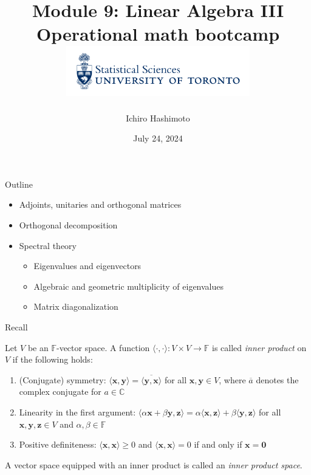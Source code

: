 \documentclass [aspectratio=169]{beamer}
\title[]{Module 9: Linear Algebra III \\ {\large Operational math bootcamp}\\ \includegraphics[width=8cm]{dept_logo.png}\vspace{-1em}}
\author[]{Ichiro Hashimoto}
\institute[]{University of Toronto}
\date{July 24, 2024}
\newcommand{\bx}{{\mathbf{x}}}
\newcommand{\by}{{\mathbf{y}}}
\newcommand{\bz}{{\mathbf{z}}}
\newcommand{\zerovec}{{\mathbf{0}}}
\newcommand{\innerprod}[1]{\langle #1 \rangle}
\newcommand{\C}{{\mathbb{C}}}
\newcommand{\F}{{\mathbb{F}}}
\begin{document}
{
\begin{frame}
    \titlepage
\end{frame}
}

\begin{frame}{Outline}

\begin{itemize}
\setlength\itemsep{1em}
\item Adjoints, unitaries and orthogonal matrices
\item Orthogonal decomposition
\item Spectral theory
    \begin{itemize}
      \setlength\itemsep{0.5em}
    	\item Eigenvalues and eigenvectors
	\item Algebraic and geometric multiplicity of eigenvalues
	\item Matrix diagonalization
    \end{itemize}
\end{itemize}

\end{frame}


\begin{frame}{Recall}
\begin{definition}
Let $V$ be an $\F$-vector space. A function $\innerprod{\cdot,\cdot} \colon V \times V \to \F$ is called \emph{inner product} on $V$ if the following holds:
\begin{enumerate}
\setlength\itemsep{0.5em}
    \item (Conjugate) symmetry: $\innerprod{\bx,\by} = \overline{\innerprod{\by,\bx}}$ for all $\bx,\by\in V$, where $\overline{a}$ denotes the complex conjugate for $a\in \C$
    \item Linearity in the first argument: $\innerprod{\alpha \bx + \beta \by, \bz} = \alpha \innerprod{\bx,\bz} + \beta \innerprod{\by,\bz}$ for all $\bx,\by,\bz\in V$ and $\alpha, \beta \in \F$
    \item Positive definiteness: $\innerprod{\bx,\bx} \geq 0$ and $\innerprod{\bx,\bx} = 0$ if and only if $\bx = \zerovec$ 
\end{enumerate}
\vspace{1em}
A vector space equipped with an inner product is called an \emph{inner product space}.
\end{definition}

\end{frame}
\end{document}
